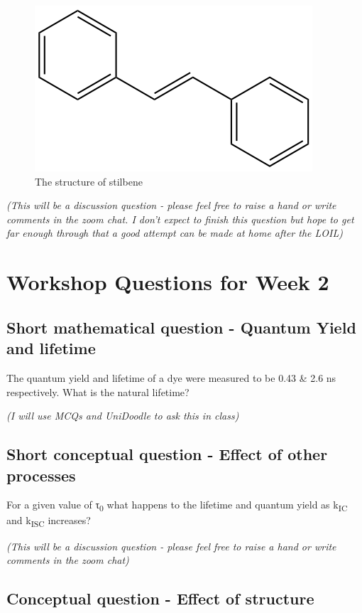 \documentclass[
]{book}
\begin{document}
\begin{figure}

{\centering \includegraphics[width=0.3\linewidth]{images/stilbene} 

}

\caption{The  structure of stilbene}\label{fig:stilbene}
\end{figure}

\emph{(This will be a discussion question - please feel free to raise a hand or write comments in the zoom chat. I don't expect to finish this question but hope to get far enough through that a good attempt can be made at home after the LOIL)}

\hypertarget{ch:Workshop2}{%
\chapter{Workshop Questions for Week 2}\label{ch:Workshop2}}

\hypertarget{sec:YieldLifetime}{%
\section{Short mathematical question - Quantum Yield and lifetime}\label{sec:YieldLifetime}}

The quantum yield and lifetime of a dye were measured to be 0.43 \& 2.6 ns respectively. What is the natural lifetime?

\emph{(I will use MCQs and UniDoodle to ask this in class)}

\hypertarget{sec:otherprocesses}{%
\section{Short conceptual question - Effect of other processes}\label{sec:otherprocesses}}

For a given value of τ\textsubscript{0} what happens to the lifetime and quantum yield as k\textsubscript{IC} and k\textsubscript{ISC} increases?

\emph{(This will be a discussion question - please feel free to raise a hand or write comments in the zoom chat)}

\hypertarget{sec:structure}{%
\section{Conceptual question - Effect of structure}\label{sec:structure}}
\end{document}
